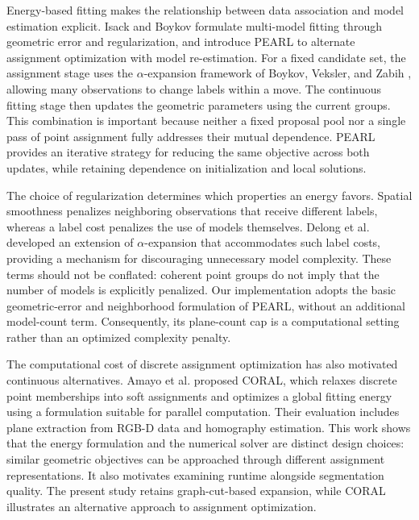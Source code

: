 Energy-based fitting makes the relationship between data association and model estimation explicit. Isack and Boykov \cite{isack2012energy} formulate multi-model fitting through geometric error and regularization, and introduce PEARL to alternate assignment optimization with model re-estimation. For a fixed candidate set, the assignment stage uses the \(\alpha\)-expansion framework of Boykov, Veksler, and Zabih \cite{boykov2001graphcuts}, allowing many observations to change labels within a move. The continuous fitting stage then updates the geometric parameters using the current groups. This combination is important because neither a fixed proposal pool nor a single pass of point assignment fully addresses their mutual dependence. PEARL provides an iterative strategy for reducing the same objective across both updates, while retaining dependence on initialization and local solutions.

The choice of regularization determines which properties an energy favors. Spatial smoothness penalizes neighboring observations that receive different labels, whereas a label cost penalizes the use of models themselves. Delong et al. \cite{delong2012labelcosts} developed an extension of \(\alpha\)-expansion that accommodates such label costs, providing a mechanism for discouraging unnecessary model complexity. These terms should not be conflated: coherent point groups do not imply that the number of models is explicitly penalized. Our implementation adopts the basic geometric-error and neighborhood formulation of PEARL, without an additional model-count term. Consequently, its plane-count cap is a computational setting rather than an optimized complexity penalty.

The computational cost of discrete assignment optimization has also motivated continuous alternatives. Amayo et al. \cite{amayo2018coral} proposed CORAL, which relaxes discrete point memberships into soft assignments and optimizes a global fitting energy using a formulation suitable for parallel computation. Their evaluation includes plane extraction from RGB-D data and homography estimation. This work shows that the energy formulation and the numerical solver are distinct design choices: similar geometric objectives can be approached through different assignment representations. It also motivates examining runtime alongside segmentation quality. The present study retains graph-cut-based expansion, while CORAL illustrates an alternative approach to assignment optimization.

